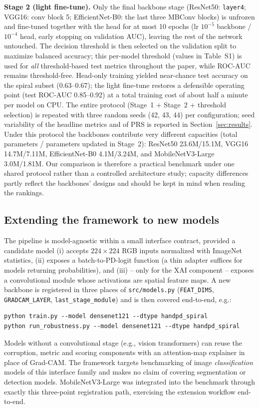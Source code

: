 \documentclass[11pt,a4paper]{article}
\begin{document}
\textbf{Stage 2 (light fine-tune).} Only the final backbone stage
(ResNet50: \texttt{layer4}; VGG16: conv block 5; EfficientNet-B0: the last
three MBConv blocks) is unfrozen and fine-tuned together with the head for at
most 10 epochs (lr $10^{-5}$ backbone / $10^{-4}$ head, early stopping on
validation AUC), leaving the rest of the network untouched. The decision
threshold is then selected on the validation split to maximize balanced
accuracy; this per-model threshold (values in Table~S1) is used for
\emph{all} threshold-based test metrics throughout the paper, while ROC-AUC
remains threshold-free. Head-only training yielded near-chance test accuracy
on the spiral subset (0.63--0.67); the light fine-tune restores a defensible
operating point (test ROC-AUC 0.85--0.92) at a total training cost of about
half a minute per model on CPU. The entire protocol (Stage~1 + Stage~2 +
threshold selection) is repeated with three random seeds (42, 43, 44) per
configuration; seed variability of the headline metrics and of PRS is
reported in Section~\ref{sec:results}. Under this protocol the backbones
contribute very different capacities (total parameters / parameters updated
in Stage~2): ResNet50 23.6M/15.1M, VGG16 14.7M/7.11M, EfficientNet-B0
4.1M/3.24M, and MobileNetV3-Large 3.0M/1.81M. Our comparison is therefore a
practical benchmark under one shared protocol rather than a controlled
architecture study; capacity
differences partly reflect the backbones' designs and should be kept in mind
when reading the rankings.

\subsection{Extending the framework to new models}
\label{sec:extensibility}
The pipeline is model-agnostic within a small interface contract, provided a
candidate model (i) accepts $224\times224$ RGB inputs normalized with
ImageNet statistics, (ii) exposes a batch-to-PD-logit function (a thin
adapter suffices for models returning probabilities), and (iii) -- only for
the XAI component -- exposes a convolutional module whose activations are
spatial feature maps. A new backbone is registered in three places of
\texttt{src/models.py} (\texttt{FEAT\_DIMS}, \texttt{GRADCAM\_LAYER},
\texttt{last\_stage\_module}) and is then covered end-to-end, e.g.:
\begin{verbatim}
python train.py --model densenet121 --dtype handpd_spiral
python run_robustness.py --model densenet121 --dtype handpd_spiral
\end{verbatim}
Models without a convolutional stage (e.g., vision transformers) can reuse
the corruption, metric and scoring components with an attention-map explainer
in place of Grad-CAM. The framework targets benchmarking of image
\emph{classification} models of this interface family and makes no claim of
covering segmentation or detection models. MobileNetV3-Large was integrated
into the benchmark through exactly this three-point registration path,
exercising the extension workflow end-to-end.
\end{document}
